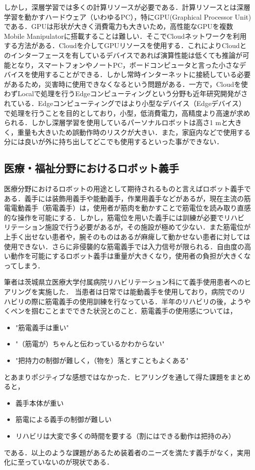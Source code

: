 しかし，深層学習では多くの計算リソースが必要である．計算リソースとは深層学習を動かすハードウェア（いわゆるPC），特にGPU(Graphical Processor Unit)である．GPUは形状が大きく消費電力も大きいため，高性能なGPUを複数Mobile Manipulatorに搭載することは難しい．そこでCloudネットワークを利用する方法がある．Cloudを介してGPUリソースを使用する．これによりCloudとのインターフェースを有しているデバイスであれば演算性能は低くても推論が可能となり，スマートフォンやノートPC，ボードコンピュータと言った小さなデバイスを使用することができる．しかし常時インターネットに接続している必要があるため，災害時に使用できなくなるという問題がある．一方で，Cloudを使わずLocalで処理を行うEdgeコンピューティングという分野も近年研究開発がされている．Edgeコンピューティングではより小型なデバイス（Edgeデバイス）で処理を行うことを目的としており，小型，低消費電力，高精度より高速が求められる．しかし深層学習を使用しているパーソナルロボットは高さ1 mと大きく，重量も大きいため誤動作時のリスクが大きい．また，家庭内などで使用する分には良いが外に持ち出してどこでも使用するといった事ができない．


\subsection{医療・福祉分野におけるロボット義手}
医療分野におけるロボットの用途として期待されるものと言えばロボット義手である．義手には装飾用義手や能動義手，作業用義手などがあるが，現在主流の筋電電動義手（筋電義手）は，使用者が筋肉を動かすことで筋電位を読み取り直感的な操作を可能にする．しかし，筋電位を用いた義手には訓練が必要でリハビリテーション施設で行う必要があるが，その施設が極めて少ない\cite{リハビリテーション}．また筋電位が上手く出せない患者や，腕そのものはあるが麻痺して動かせない患者に対しては使用できない．さらに非侵襲的な筋電義手では入力信号が限られる．自由度の高い動作を可能にするロボット義手は重量が大きくなり，使用者の負担が大きくなってしまう．

筆者は茨城県立医療大学付属病院リハビリテーション科にて義手使用患者へのヒアリングを実施した．
当患者は日常では能動義手を使用しており，病院でのリハビリの際に筋電義手の使用訓練を行なっている．半年のリハビリの後，ようやくペンを掴むことまでできた状況とのこと．筋電義手の使用感については，
\begin{itemize}
    \item "筋電義手は重い"
    \item "（筋電が）ちゃんと伝わっているかわからない"
    \item "把持力の制御が難しく，（物を）落とすこともよくある"
\end{itemize}
とあまりポジティブな感想ではなかった．ヒアリングを通して得た課題をまとめると，
\begin{itemize}
    \item 義手本体が重い
    \item 筋電による義手の制御が難しい
    \item リハビリは大変で多くの時間を要する（割にはできる動作は把持のみ）
\end{itemize}
である．以上のような課題があるため装着者のニーズを満たす義手がなく，実用化に至っていないのが現状である．

